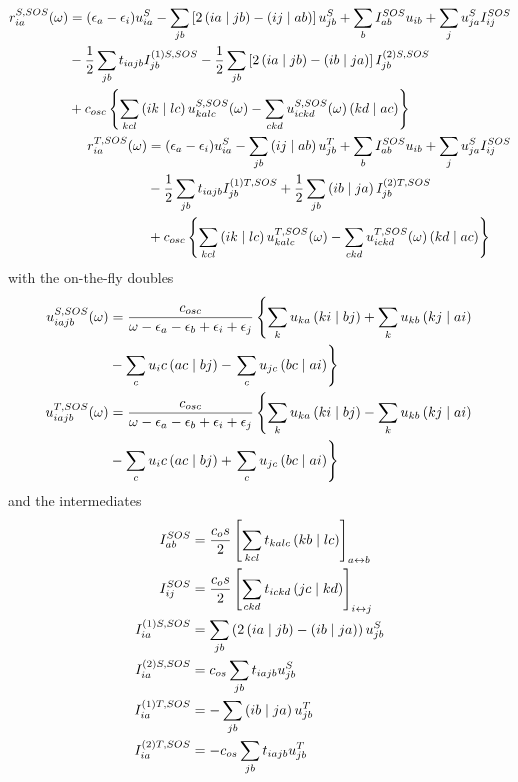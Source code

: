 \begin{align}
\begin{split}
r_{ia}^{S,SOS}(\omega) &= (\epsilon_a - \epsilon_i) u_{ia}^S - \sum_{jb} \left[ 2\left( ia \mid jb \right) - \left( ij \mid ab \right) \right] u_{jb}^S + \sum_b I^{SOS}_{ab} u_{ib} + \sum_j u_{ja}^S I^{SOS}_{ij} \\
&- \frac{1}{2} \sum_{jb} t_{iajb}I^{(1)S,SOS}_{jb} - \frac{1}{2} \sum_{jb} \left[ 2\left( ia \mid jb \right) - \left( ib \mid ja \right) \right] I^{(2)S,SOS}_{jb} \\
&+ c_{osc} \left\lbrace \sum_{kcl} \left( ik \mid lc \right) u^{S,SOS}_{kalc}(\omega) - \sum_{ckd} u^{S,SOS}_{ickd}(\omega) \left( kd \mid ac \right) \right\rbrace
\end{split}
\label{eq:SOSRADC2S}
\\
\begin{split}
r_{ia}^{T,SOS}(\omega) &= (\epsilon_a - \epsilon_i) u_{ia}^S - \sum_{jb} \left( ij \mid ab \right) u_{jb}^T + \sum_b I^{SOS}_{ab} u_{ib} + \sum_j u_{ja}^S I^{SOS}_{ij} \\
&- \frac{1}{2} \sum_{jb} t_{iajb}I^{(1)T,SOS}_{jb} + \frac{1}{2} \sum_{jb} \left( ib \mid ja \right) I^{(2)T,SOS}_{jb} \\
&+ c_{osc} \left\lbrace \sum_{kcl} \left( ik \mid lc \right) u^{T,SOS}_{kalc}(\omega) - \sum_{ckd} u^{T,SOS}_{ickd}(\omega) \left( kd \mid ac \right) \right\rbrace
\end{split}
\label{eq:SOSRADC2T}
\end{align}
\noindent with the on-the-fly doubles
\begin{align}
\begin{split}
u_{iajb}^{S,SOS}(\omega) &= \frac{c_{osc}}{\omega - \epsilon_a - \epsilon_b + \epsilon_i + \epsilon_j} \left\lbrace \sum_k u_{ka} \left( ki \mid bj \right) + \sum_{k} u_{kb} \left( kj \mid ai \right) \right. \\ 
&- \sum_c u_ic \left( ac \mid bj \right) - \left. \sum_{c} u_{jc} \left( bc \mid ai \right) \right\rbrace
\end{split}
\\
\begin{split}
u_{iajb}^{T,SOS}(\omega) &= \frac{c_{osc}}{\omega - \epsilon_a - \epsilon_b + \epsilon_i + \epsilon_j} \left\lbrace \sum_k u_{ka} \left( ki \mid bj \right) - \sum_{k} u_{kb} \left( kj \mid ai \right) \right. \\ 
&- \sum_c u_ic \left( ac \mid bj \right) + \left. \sum_{c} u_{jc} \left( bc \mid ai \right) \right\rbrace
\end{split}
\end{align}
\noindent and the intermediates
\begin{align}
I_{ab}^{SOS} &= \frac{c_os}{2} \left[ \sum_{kcl} t_{kalc} \left( kb \mid lc \right) \right]_{a \leftrightarrow b}
\\
I_{ij}^{SOS} &= \frac{c_os}{2} \left[ \sum_{ckd} t_{ickd} \left( jc \mid kd \right) \right]_{i \leftrightarrow j}
\\
I^{(1)S,SOS}_{ia} &= \sum_{jb} \left( 2\left( ia \mid jb \right) - \left( ib \mid ja \right) \right) u_{jb}^S
\\
I^{(2)S,SOS}_{ia} &= c_{os} \sum_{jb} t_{iajb} u_{jb}^S
\\
I^{(1)T,SOS}_{ia} &= - \sum_{jb} \left( ib \mid ja \right) u_{jb}^T
\\
I^{(2)T,SOS}_{ia} &= - c_{os} \sum_{jb} t_{iajb} u_{jb}^T
\end{align}

